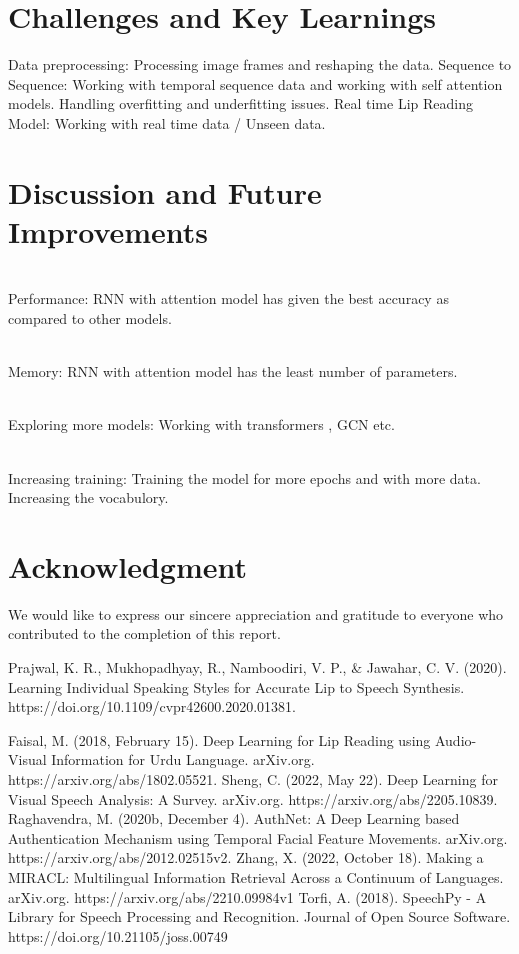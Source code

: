 \documentclass[conference]{IEEEtran}
\begin{document}

\section{Challenges and Key Learnings}
 Data preprocessing: Processing image frames and reshaping the data.
 Sequence to Sequence: Working with temporal sequence data and working with self attention models.
 Handling overfitting and underfitting issues.
 Real time Lip Reading Model: Working with real time data / Unseen data.
\section{Discussion and Future Improvements}
\\ Performance: RNN with attention model has given the best accuracy as compared to other models. 

\\ Memory: RNN with attention model has the least number of parameters.

\\ Exploring more models: Working with transformers , GCN etc.

\\ Increasing training: Training the model for more epochs and with more data. Increasing the vocabulory.
\section*{Acknowledgment}

We would like to express our sincere appreciation and gratitude to everyone who contributed to the completion of this report.


\begin{thebibliography}{00}
 Prajwal, K. R., Mukhopadhyay, R., Namboodiri, V. P., & Jawahar, C. V. (2020). Learning Individual Speaking Styles for Accurate Lip to Speech Synthesis. https://doi.org/10.1109/cvpr42600.2020.01381.

 Faisal, M. (2018, February 15). Deep Learning for Lip Reading using Audio-Visual Information for Urdu Language. arXiv.org. https://arxiv.org/abs/1802.05521.
 Sheng, C. (2022, May 22). Deep Learning for Visual Speech Analysis: A Survey. arXiv.org. https://arxiv.org/abs/2205.10839.
 Raghavendra, M. (2020b, December 4). AuthNet: A Deep Learning based Authentication Mechanism using Temporal Facial Feature Movements. arXiv.org. https://arxiv.org/abs/2012.02515v2.
 Zhang, X. (2022, October 18). Making a MIRACL: Multilingual Information Retrieval Across a Continuum of Languages. arXiv.org. https://arxiv.org/abs/2210.09984v1
 Torfi, A. (2018). SpeechPy - A Library for Speech Processing and Recognition. Journal of Open Source Software. https://doi.org/10.21105/joss.00749
\end{thebibliography}
\vspace{12pt}
\end{document}
